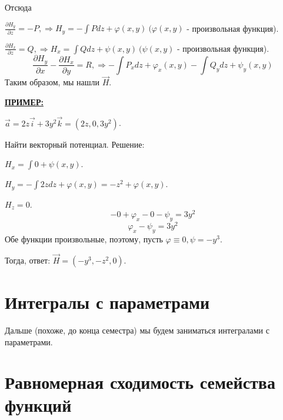 \documentclass[12pt]{article}
\begin{document}
Отсюда \par$\frac{\partial H_y}{\partial z} = -P, \Rightarrow H_y = -\int Pdz + \varphi(x,y) \ (\varphi(x,y)$ - произвольная функция).\par
\indent $\frac{\partial H_x}{\partial z} = Q, \Rightarrow H_x = \int Qdz + \psi(x,y) \ (\psi(x,y)$ - произвольная функция).
$$\frac{\partial H_y}{\partial x} - \frac{\partial H_x}{\partial y} = R, \Rightarrow -\int P_x dz + \varphi_x(x,y) - \int Q_y dz + \psi_y(x,y)$$
Таким образом, мы нашли $\overrightarrow{H}$.\par
\uline{\textbf{ПРИМЕР:}}\par
$\overrightarrow{a} = 2 z \overrightarrow{i} + 3 y^2 \overrightarrow{k} = (2z, 0, 3y^2)$.\par
Найти векторный потенциал. Решение:\par
$H_x = \int 0 + \psi (x,y)$.\par
$H_y = -\int 2z dz + \varphi (x,y) = -z^2 + \varphi(x,y)$.\par
$H_z = 0$.
$$-0 + \varphi_x - 0 - \psi_y = 3y^2$$
$$\varphi_x - \psi_y = 3y^2$$
Обе функции произвольные, поэтому, пусть $\varphi \equiv 0, \psi = -y^3$.\par
Тогда, ответ: $\overrightarrow{H} = (-y^3, -z^2, 0)$.\par
\section{Интегралы с параметрами}
Дальше (похоже, до конца семестра) мы будем заниматься интегралами с параметрами.\par
\section{Равномерная сходимость семейства функций}
\end{document}
